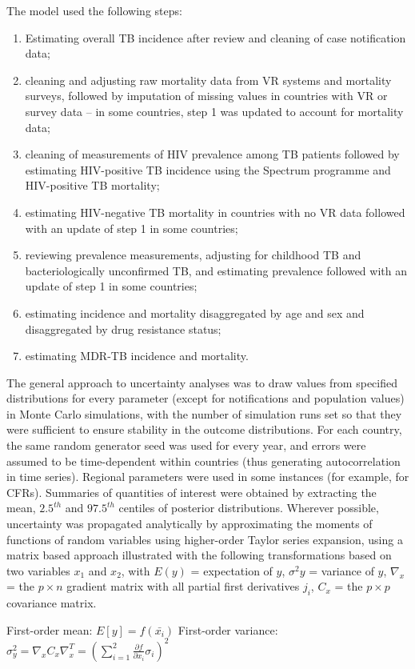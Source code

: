 The model used  the following steps: 

\begin{enumerate}
\item Estimating overall TB incidence after review and cleaning of case notification data;
\item cleaning and adjusting raw mortality data from VR systems and mortality surveys, followed by imputation of missing values in countries with VR or survey data – in some countries, step 1 was updated to account for mortality data;
\item cleaning of measurements of HIV prevalence among TB patients followed by estimating HIV-positive TB incidence using the Spectrum programme and HIV-positive TB mortality;
\item estimating HIV-negative TB mortality in countries with no VR data followed with an update of step 1 in some countries; 
\item reviewing prevalence measurements, adjusting for childhood TB and bacteriologically unconfirmed TB,  and estimating prevalence followed with an update of step 1 in some countries; 
\item estimating incidence and mortality disaggregated by age and sex and disaggregated by drug resistance status;
\item estimating MDR-TB incidence and mortality.
\end{enumerate}

The general approach to uncertainty analyses was to draw values from specified distributions for every parameter (except for notifications and population values) in Monte Carlo simulations, with the number of simulation runs set so that they were sufficient to ensure stability in the outcome distributions. For each country, the same random generator seed was used for every year, and errors were assumed to be time-dependent within countries (thus generating autocorrelation in time series). Regional parameters were used in some instances (for example, for CFRs). Summaries of quantities of interest were obtained by extracting the mean, $2.5^{th}$ and $97.5^{th}$ centiles of posterior distributions. Wherever possible, uncertainty was propagated analytically by approximating the moments of functions of random variables using higher-order Taylor series expansion\cite{Ku_1966}, using a matrix based approach\cite{Lab1998-dy} illustrated with the following transformations based on two variables $x_1$ and $x_2$, with $E(y)$ = expectation of $y$, $\sigma^2 y$ = variance of $y$, $\nabla_x$ = the $p \times n$ gradient matrix with all partial first derivatives $j_i$, $C_x$ = the $p \times p$ covariance matrix.

First-order mean: $E[y] = f(\bar{x_i})$
First-order variance: $\sigma^2_y=\nabla_x C_x \nabla^T_x=\left(\sum_{i=1}^{2}\frac{\partial{f}}{\partial{x_i}}\sigma_i\right)^2$



